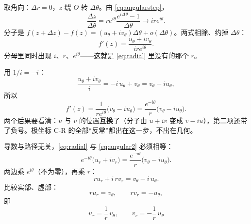 \documentclass[11pt]{ctexart}
\let\origsubhdr\subhdr
\renewcommand{\subhdr}[1]{\par\needspace{4\baselineskip}\origsubhdr{#1}}
\begin{document}



取角向：$\Delta r=0$，$z$ 绕 $O$ 转 $\Delta\theta$。由 \eqref{eq:angularstep}，
\begin{equation}\label{eq:dzdtheta}
\frac{\Delta z}{\Delta\theta}=re^{i\theta}\frac{e^{i\Delta\theta}-1}{\Delta\theta}\longrightarrow ire^{i\theta}.
\end{equation}
分子是 $f(z+\Delta z)-f(z)=(u_\theta+iv_\theta)\Delta\theta+o(\Delta\theta)$。两式相除、约掉 $\Delta\theta$：
\begin{equation}\label{eq:angular}
f'(z)=\frac{u_\theta+iv_\theta}{ire^{i\theta}} .
\end{equation}
分母里同时出现 $i$、$r$、$e^{i\theta}$——这就是 \eqref{eq:radial} 里没有的那个 $r$。


用 $1/i=-i$：
\begin{equation}\label{eq:divi}
\frac{u_\theta+iv_\theta}{i}=-i\,u_\theta+v_\theta=v_\theta-iu_\theta ,
\end{equation}
所以
\begin{equation}\label{eq:angular2}
f'(z)=\frac{1}{re^{i\theta}}\bigl(v_\theta-iu_\theta\bigr)=\frac{e^{-i\theta}}{r}\bigl(v_\theta-iu_\theta\bigr).
\end{equation}
两个后果要看清：$u$ 与 $v$ 的位置\textbf{互换}了（分子由 $u+iv$ 变成 $v-iu$），第二项还带了负号。极坐标 C-R 的全部“反常”都出在这一步，不出在几何。




导数与路径无关，\eqref{eq:radial} 与 \eqref{eq:angular2} 必须相等：
\[ e^{-i\theta}\bigl(u_r+iv_r\bigr)=\frac{e^{-i\theta}}{r}\bigl(v_\theta-iu_\theta\bigr). \]
两边乘 $e^{i\theta}$（不为零），再乘 $r$：
\[ r u_r+i\,r v_r=v_\theta-i\,u_\theta . \]
比较实部、虚部：
\[ r u_r=v_\theta,\qquad r v_r=-u_\theta , \]
即
\begin{equation}\label{eq:polarCR}
\boxed{\;u_r=\frac1r\,v_\theta,\qquad v_r=-\frac1r\,u_\theta\;}
\end{equation}
\end{document}
